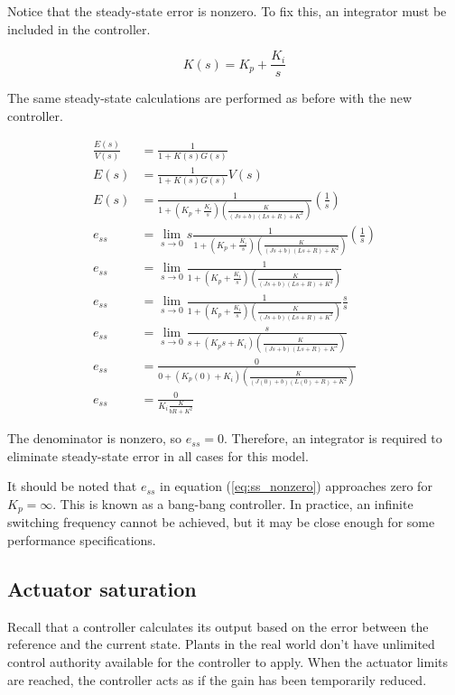 Notice that the \gls{steady-state error} is nonzero. To fix this, an integrator
must be included in the controller.

\begin{equation*}
  K(s) = K_p + \frac{K_i}{s}
\end{equation*}

The same steady-state calculations are performed as before with the new
controller.

\begin{align*}
  \frac{E(s)}{V(s)} &= \frac{1}{1 + K(s)G(s)} \\
  E(s) &= \frac{1}{1 + K(s)G(s)} V(s) \\
  E(s) &= \frac{1}{1 + \left(K_p + \frac{K_i}{s}\right)
    \left(\frac{K}{(Js+b)(Ls+R)+K^2}\right)} \left(\frac{1}{s}\right) \\
  e_{ss} &= \lim_{s\to0} s \frac{1}{1 + \left(K_p + \frac{K_i}{s}\right)
    \left(\frac{K}{(Js+b)(Ls+R)+K^2}\right)} \left(\frac{1}{s}\right) \\
  e_{ss} &= \lim_{s\to0} \frac{1}{1 + \left(K_p + \frac{K_i}{s}\right)
    \left(\frac{K}{(Js+b)(Ls+R)+K^2}\right)} \\
  e_{ss} &= \lim_{s\to0} \frac{1}{1 + \left(K_p + \frac{K_i}{s}\right)
    \left(\frac{K}{(Js+b)(Ls+R)+K^2}\right)} \frac{s}{s} \\
  e_{ss} &= \lim_{s\to0} \frac{s}{s + \left(K_p s + K_i\right)
    \left(\frac{K}{(Js+b)(Ls+R)+K^2}\right)} \\
  e_{ss} &= \frac{0}{0 + (K_p (0) + K_i)
    \left(\frac{K}{(J(0)+b)(L(0)+R)+K^2}\right)} \\
  e_{ss} &= \frac{0}{K_i \frac{K}{bR+K^2}}
\end{align*}

The denominator is nonzero, so $e_{ss} = 0$. Therefore, an integrator is
required to eliminate \gls{steady-state error} in all cases for this
\gls{model}.

It should be noted that $e_{ss}$ in equation (\ref{eq:ss_nonzero}) approaches
zero for $K_p = \infty$. This is known as a bang-bang controller. In practice,
an infinite switching frequency cannot be achieved, but it may be close enough
for some performance specifications.

\subsection{Actuator saturation}

Recall that a controller calculates its output based on the error between the
reference and the current state. Plants in the real world don't have unlimited
control authority available for the controller to apply. When the actuator
limits are reached, the controller acts as if the gain has been temporarily
reduced.

